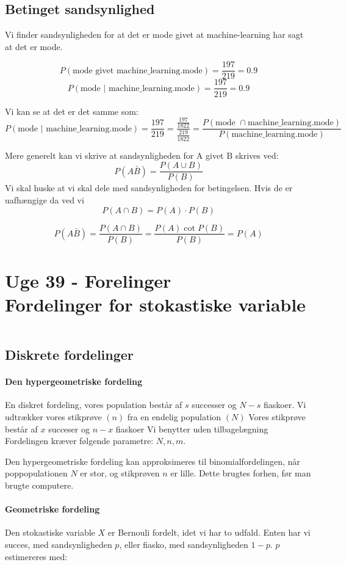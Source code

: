 \documentclass{article}
\begin{document}
\subsection{Betinget sandsynlighed}
Vi finder sandsynligheden for at det er mode givet at machine-learning har sagt
at det er mode.

$$P(\text{mode givet machine\_learning.mode}) = \frac{197}{219} = 0.9$$
$$P(\text{mode $|$ machine\_learning.mode}) = \frac{197}{219} = 0.9$$

Vi kan se at det er det samme som:
$$P(\text{mode $|$ machine\_learning.mode}) = \frac{197}{219} =
\frac{\frac{197}{1822}}{\frac{219}{1822}} = \frac{P(\text{mode $\cap$
machine\_learning.mode})}{P(\text{machine\_learning.mode})} $$

Mere generelt kan vi skrive at sandsynligheden for A givet B skrives ved:
$$P (A \bar B) = \frac{P( A \cup B)}{P(B)}$$ Vi skal huske at vi skal dele med
sandsynligheden for betingelsen. Hvis de er uafhængige da ved vi
$$P(A \cap B) = P(A) \cdot P(B) $$

$$P(A \bar B) = \frac{P(A\cap B)}{P(B)} = \frac{P(A) \cot P(B)}{P(B)} = P(A)$$

\newpage

\section{Uge 39 - Forelinger \\ Fordelinger for stokastiske variable} 
\[  \] 
\subsection{Diskrete fordelinger}
\paragraph{Den hypergeometriske fordeling}
En diskret fordeling, vores population består af $s$ successer og $N-s$
fiaskoer. Vi udtrækker vores stikprøve $(n)$ fra en endelig population $(N)$
Vores stikprøve består af $x$ succeser og $n-x$ fiaskoer Vi benytter uden
tilbagelægning Fordelingen kræver følgende parametre: $N, n, m$.


Den hypergeometriske fordeling kan approksimeres til binomialfordelingen, når
poppopulationen $N$ er stor, og stikprøven $n$ er lille. Dette brugtes forhen,
før man brugte computere.

\paragraph{Geometriske fordeling}
Den stokastiske variable $X$ er Bernouli fordelt, idet vi har to udfald. Enten
har vi succes, med sandsynligheden $p$, eller fiasko, med sandsynligheden $1-p$.
$p$ estimereres med:
\end{document}
